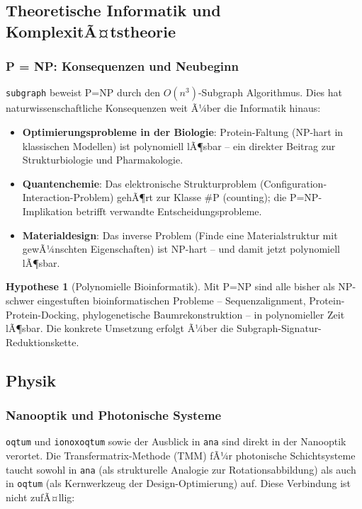 ﻿\documentclass[a4paper,12pt]{scrreprt}
\theoremstyle{definition}
\newtheorem{hypothese}{Hypothese}[section]
\begin{document}
\subsection{Theoretische Informatik und KomplexitÃ¤tstheorie}

\subsubsection{P = NP: Konsequenzen und Neubeginn}

\texttt{subgraph} beweist P=NP durch den $O(n^3)$-Subgraph Algorithmus.
Dies hat naturwissenschaftliche Konsequenzen weit Ã¼ber die Informatik hinaus:

\begin{itemize}
  \item \textbf{Optimierungsprobleme in der Biologie}: Protein-Faltung
    (NP-hart in klassischen Modellen) ist polynomiell lÃ¶sbar -- ein
    direkter Beitrag zur Strukturbiologie und Pharmakologie.
  \item \textbf{Quantenchemie}: Das elektronische Strukturproblem
    (Configuration-Interaction-Problem) gehÃ¶rt zur Klasse \#P (counting);
    die P=NP-Implikation betrifft verwandte Entscheidungsprobleme.
  \item \textbf{Materialdesign}: Das inverse Problem (Finde eine
    Materialstruktur mit gewÃ¼nschten Eigenschaften) ist NP-hart -- und
    damit jetzt polynomiell lÃ¶sbar.
\end{itemize}

\begin{hypothese}[Polynomielle Bioinformatik]
  Mit P=NP sind alle bisher als NP-schwer eingestuften bioinformatischen
  Probleme -- Sequenzalignment, Protein-Protein-Docking, phylogenetische
  Baumrekonstruktion -- in polynomieller Zeit lÃ¶sbar. Die konkrete
  Umsetzung erfolgt Ã¼ber die Subgraph-Signatur-Reduktionskette.
\end{hypothese}

\subsection{Physik}

\subsubsection{Nanooptik und Photonische Systeme}

\texttt{oqtum} und \texttt{ionoxoqtum} sowie der Ausblick in \texttt{ana}
sind direkt in der Nanooptik verortet. Die Transfermatrix-Methode (TMM)
fÃ¼r photonische Schichtsysteme taucht sowohl in \texttt{ana} (als strukturelle
Analogie zur Rotationsabbildung) als auch in \texttt{oqtum} (als Kernwerkzeug
der Design-Optimierung) auf. Diese Verbindung ist nicht zufÃ¤llig:
\end{document}
